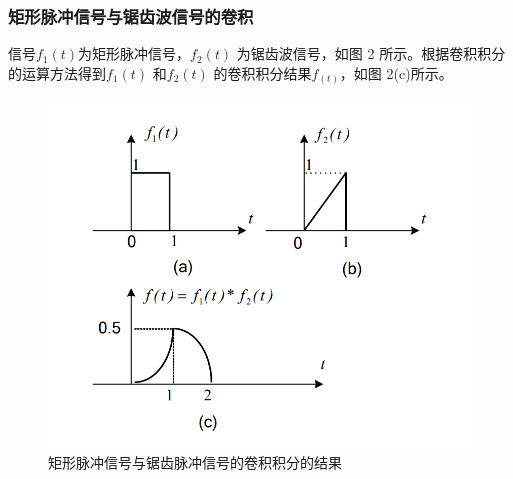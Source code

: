 \documentclass[UTF8,AutoFakeBold]{ctexart}
\begin{document}
	\subsubsection{\heiti{}矩形脉冲信号与锯齿波信号的卷积}
	信号$f_1(t)$为矩形脉冲信号，$f_2(t)$ 为锯齿波信号，如图 2 所示。根据卷积积分的运算方法得到$f_1(t)$ 和$f_2(t)$ 的卷积积分结果$f_(t)$，如图 2(c)所示。
		\begin{figure}[ht]
			\centering
			\includegraphics[scale=0.5]{./figures/photo2.png}
			\caption{矩形脉冲信号与锯齿脉冲信号的卷积积分的结果}
		\end{figure}
\end{document}
